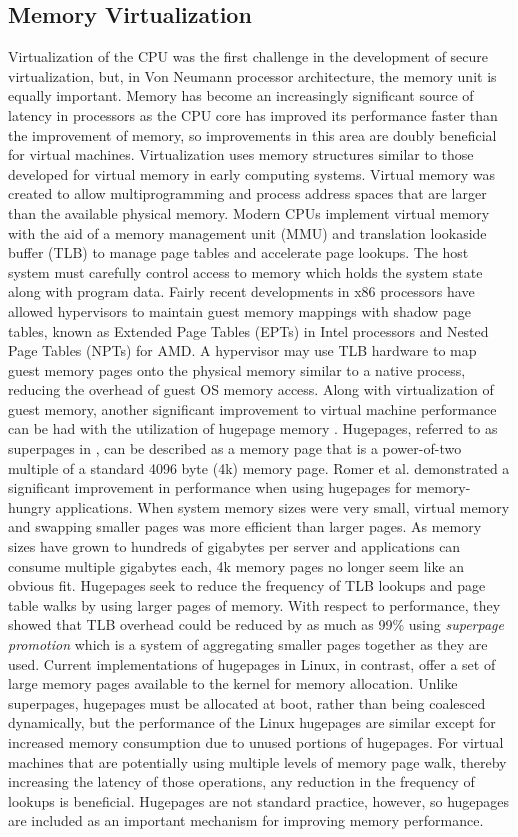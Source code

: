 \subsection{Memory Virtualization}
\label{sec:vt_memory}
Virtualization of the CPU was the first challenge in the development of secure virtualization, but, in Von Neumann processor architecture, the memory unit is equally important.
Memory has become an increasingly significant source of latency in processors as the CPU core has improved its performance faster than the improvement of memory, so improvements in this area are doubly beneficial for virtual machines.
Virtualization uses memory structures similar to those developed for virtual memory in early computing systems.
Virtual memory was created to allow multiprogramming and process address spaces that are larger than the available physical memory.
Modern CPUs implement virtual memory with the aid of a memory management unit (MMU) and translation lookaside buffer (TLB) to manage page tables and accelerate page lookups.
The host system must carefully control access to memory which holds the system state along with program data.
Fairly recent developments in x86 processors have allowed hypervisors to maintain guest memory mappings with shadow page tables, known as Extended Page Tables (EPTs) in Intel processors and Nested Page Tables (NPTs) for AMD.
A hypervisor may use TLB hardware to map guest memory pages onto the physical memory similar to a native process, reducing the overhead of guest OS memory access.
Along with virtualization of guest memory, another significant improvement to virtual machine performance can be had with the utilization of hugepage memory \autocite{_romer_1}.
Hugepages, referred to as superpages in \autocite{_romer_1}, can be described as a memory page that is a power-of-two multiple of a standard 4096 byte (4k) memory page.
Romer et al. demonstrated a significant improvement in performance when using hugepages for memory-hungry applications.
When system memory sizes were very small, virtual memory and swapping smaller pages was more efficient than larger pages.
As memory sizes have grown to hundreds of gigabytes per server and applications can consume multiple gigabytes each, 4k memory pages no longer seem like an obvious fit.
Hugepages seek to reduce the frequency of TLB lookups and page table walks by using larger pages of memory.
With respect to performance, they showed that TLB overhead could be reduced by as much as 99\% using \emph{superpage promotion} which is a system of aggregating smaller pages together as they are used.
Current implementations of hugepages in Linux, in contrast, offer a set of large memory pages available to the kernel for memory allocation.
Unlike superpages, hugepages must be allocated at boot, rather than being coalesced dynamically, but the performance of the Linux hugepages are similar except for increased memory consumption due to unused portions of hugepages.
For virtual machines that are potentially using multiple levels of memory page walk, thereby increasing the latency of those operations, any reduction in the frequency of lookups is beneficial.
Hugepages are not standard practice, however, so hugepages are included as an important mechanism for improving memory performance.

